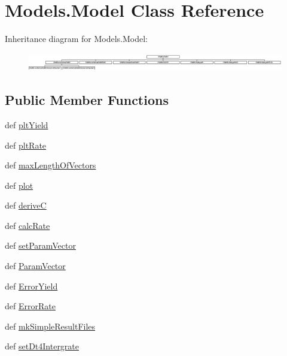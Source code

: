 \hypertarget{classModels_1_1Model}{\section{\-Models.\-Model \-Class \-Reference}
\label{classModels_1_1Model}
}
\-Inheritance diagram for \-Models.\-Model\-:\begin{figure}[H]
\begin{center}
\leavevmode
\includegraphics[height=0.777778cm]{classModels_1_1Model}
\end{center}
\end{figure}
\subsection*{\-Public \-Member \-Functions}
\begin{DoxyCompactItemize}
\item 
def \hyperlink{classModels_1_1Model_a317ed848b969dbe3a96dd05e8b771900}{plt\-Yield}
\item 
def \hyperlink{classModels_1_1Model_aa35c741babf8f141df48c4021e0664e4}{plt\-Rate}
\item 
def \hyperlink{classModels_1_1Model_a3396d6ca1a7b7d66e55ada8c3c7a509e}{max\-Length\-Of\-Vectors}
\item 
def \hyperlink{classModels_1_1Model_ae404a691e48bfe4eafcdfdd09f1dae48}{plot}
\item 
def \hyperlink{classModels_1_1Model_a010945ed2adff59a7a5fce36025e7a97}{derive\-C}
\item 
def \hyperlink{classModels_1_1Model_a7c9280e33f9e0d46703cebc131008c65}{calc\-Rate}
\item 
def \hyperlink{classModels_1_1Model_a818f207e2a4bd0e9a3720ca611960e5a}{set\-Param\-Vector}
\item 
def \hyperlink{classModels_1_1Model_a13c76a0fe24d43cdc4d21fbc73fa96fa}{\-Param\-Vector}
\item 
def \hyperlink{classModels_1_1Model_ad3e627980d9e781bf7b2c9ff900ca06b}{\-Error\-Yield}
\item 
def \hyperlink{classModels_1_1Model_a3050eb39341f318d8d88b172f88bd240}{\-Error\-Rate}
\item 
def \hyperlink{classModels_1_1Model_adcb987bccae63a742490ea1e6d5f7a74}{mk\-Simple\-Result\-Files}
\item 
def \hyperlink{classModels_1_1Model_ac28252ae5cd6b5ecd4c5d006a0e6567d}{set\-Dt4\-Intergrate}
\end{DoxyCompactItemize}
